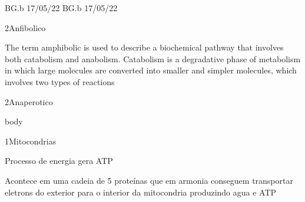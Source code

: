 \documentclass[\mainfilename]{subfiles}
\begin{document}
{BG.b 17/05/22}
{BG.b 17/05/22}


\begin{sectionBox}2{Anfibolico}
    
    The term amphibolic is used to describe a biochemical pathway that involves both catabolism and anabolism. Catabolism is a degradative phase of metabolism in which large molecules are converted into smaller and simpler molecules, which involves two types of reactions
    
\end{sectionBox}

\begin{sectionBox}2{Anaperotico}
    
    body
    
\end{sectionBox}

\begin{sectionBox}1{Mitocondrias}
    
    Processo de energia gera ATP

    Acontece em uma cadeia de 5 proteínas que em armonia conseguem transportar eletrons do exterior para o interior da mitocondria produzindo agua e ATP
    
\end{sectionBox}
\end{document}
